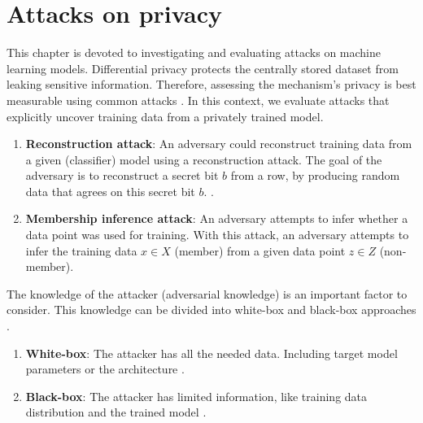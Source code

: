 \chapter{Attacks on privacy} \label{section: MIA}
This chapter is devoted to investigating and evaluating attacks on machine learning models.
Differential privacy protects the centrally stored dataset from leaking sensitive information.
Therefore, assessing the mechanism's privacy is best measurable using common attacks \citep{jayaraman_evaluating_nodate}.
In this context, we evaluate attacks that explicitly uncover training data from a privately trained model.
\begin{enumerate}
  \item \textbf{Reconstruction attack}:  An adversary could reconstruct training data from a given (classifier) model using a reconstruction attack. The goal of the adversary is to reconstruct a secret bit $b$ from a row, by producing random data that agrees on this secret bit $b$. \citep{dwork_exposed_2017}.
  \item \textbf{Membership inference attack}: An adversary attempts to infer whether a data point was used for training. With this attack, an adversary attempts to infer the training data $x \in X$ (member) from a given data point $z \in Z$ (non-member).

\end{enumerate}
The knowledge of the attacker (adversarial knowledge) is an important factor to consider.
This knowledge can be divided into white-box and black-box approaches \citep{hu_membership_2022}.
\begin{enumerate}
  \item \textbf{White-box}: The attacker has all the needed data. Including target model parameters or the architecture \citep{hu_membership_2022}.
  \item \textbf{Black-box}: The attacker has limited information, like training data distribution and the trained model \citep{hu_membership_2022}.
\end{enumerate}
